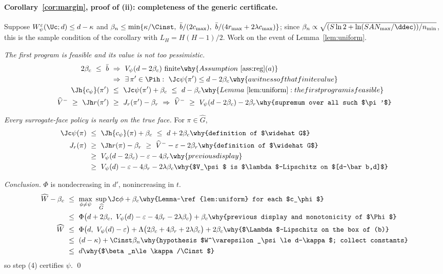 \paragraph{Corollary~\ref{cor:margin}, proof of (ii): completeness of the generic certificate.} Suppose
$W^\varepsilon_\psi(\Uc;d)\le d-\kappa$ and
$\beta_n\le\min\{\kappa/\Cinst,\ \bar b/(2c_{\max}),\ \bar b/(4r_{\max}+2\lambda c_{\max})\}$;
since $\beta_n\propto\sqrt{(S\ln2+\ln(SAN_{\max}/\ddec))/n_{\min}}$, this is
the sample condition of the corollary with $L_H=H(H-1)/2$. Work on the event
of Lemma~\ref{lem:uniform}.

\emph{The first program is feasible and its value is not too pessimistic.}
\begin{align*}
2\beta_c\ \le\ \bar b\ &\Rightarrow\ V_\psi(d-2\beta_c)\ \text{finite}
   \why{Assumption~\ref{ass:reg}(a)}\\
   &\Rightarrow\ \exists\,\pi'\in\Pih:\ \Jc\psi(\pi')\le d-2\beta_c
   \why{a witness of that finite value}\\
\Jh{c_\psi}(\pi')\ &\le\ \Jc\psi(\pi')+\beta_c\ \le\ d-\beta_c
   \why{Lemma~\ref{lem:uniform}: the first program is feasible}\\
\widehat V^-\ \ge\ \Jh r(\pi')\ &\ge\ J_r(\pi')-\beta_r\
   \Rightarrow\ \widehat V^-\ \ge\ V_\psi(d-2\beta_c)-2\beta_r
   \why{supremum over all such $\pi'$}
\end{align*}

\emph{Every surrogate-face policy is nearly on the true face.} For
$\pi\in\widehat G$,
\begin{align*}
\Jc\psi(\pi)\ &\le\ \Jh{c_\psi}(\pi)+\beta_c\ \le\ d+2\beta_c
   \why{definition of $\widehat G$}\\
J_r(\pi)\ &\ge\ \Jh r(\pi)-\beta_r\ \ge\ \widehat V^--\varepsilon-2\beta_r
   \why{definition of $\widehat G$}\\
   &\ge\ V_\psi(d-2\beta_c)-\varepsilon-4\beta_r
   \why{previous display}\\
   &\ge\ V_\psi(d)-\varepsilon-4\beta_r-2\lambda\beta_c
   \why{$V_\psi$ is $\lambda$-Lipschitz on $[d-\bar b,d]$}
\end{align*}

\emph{Conclusion.} $\Phi$ is nondecreasing in $d'$, nonincreasing in $t$.
\begin{align*}
\widehat W-\beta_c\ &\le\ \max_{\phi\ne\psi}\ \sup_{\widehat G}\Jc\phi+\beta_c
   \why{Lemma~\ref{lem:uniform} for each $c_\phi$}\\
   &\le\ \Phi\big(d+2\beta_c,\ V_\psi(d)-\varepsilon-4\beta_r-2\lambda\beta_c\big)+\beta_c
   \why{previous display and monotonicity of $\Phi$}\\
\widehat W\ &\le\ \Phi\big(d,\ V_\psi(d)-\varepsilon\big)+\Lambda\big(2\beta_c+4\beta_r+2\lambda\beta_c\big)+2\beta_c
   \why{$\Lambda$-Lipschitz on the box of (b)}\\
   &\le\ (d-\kappa)+\Cinst\beta_n
   \why{hypothesis $W^\varepsilon_\psi\le d-\kappa$; collect constants}\\
   &\le\ d \why{$\beta_n\le\kappa/\Cinst$}
\end{align*}
so step (4) certifies $\psi$. \qed

